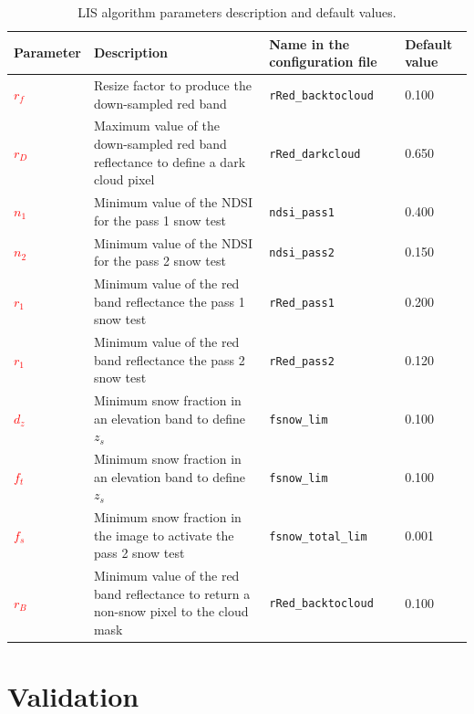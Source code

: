 \documentclass[a4paper]{article}
\begin{document}
\begin{table}
\begin{center}
\begin{tabularx}{\textwidth}{|l X l l|}
\hline
Parameter & Description & Name in the configuration file & Default value\\
\hline
\textcolor{red}{$r_f$} & Resize factor to produce the down-sampled red band & \texttt{rRed\_backtocloud} & 0.100 \\
\textcolor{red}{$r_D$} & Maximum value of the down-sampled red band reflectance to define a dark cloud pixel & \texttt{rRed\_darkcloud} & 0.650 \\
\textcolor{red}{$n_1$} & Minimum value of the NDSI for the pass 1 snow test & \texttt{ndsi\_pass1} & 0.400\\
\textcolor{red}{$n_2$} & Minimum value of the NDSI for the pass 2 snow test & \texttt{ndsi\_pass2} & 0.150\\
\textcolor{red}{$r_1$} & Minimum value of the red band reflectance the pass 1 snow test  & \texttt{rRed\_pass1} & 0.200 \\
\textcolor{red}{$r_1$} & Minimum value of the red band reflectance the pass 2 snow test  & \texttt{rRed\_pass2} & 0.120 \\
\textcolor{red}{$d_z$} & Minimum snow fraction in an elevation band to define $z_s$ & \texttt{fsnow\_lim} & 0.100 \\
\textcolor{red}{$f_t$} & Minimum snow fraction in an elevation band to define $z_s$ & \texttt{fsnow\_lim} & 0.100 \\
\textcolor{red}{$f_s$} & Minimum snow fraction in the image to activate the pass 2 snow test & \texttt{fsnow\_total\_lim} & 0.001 \\
\textcolor{red}{$r_B$} & Minimum value of the red band reflectance to return a non-snow pixel to the cloud mask & \texttt{rRed\_backtocloud} & 0.100 \\
\hline
\end{tabularx}
\end{center}
\caption{LIS algorithm parameters description and default values.}
\end{table}\label{tab:param}



\section{Validation}\label{par:validation}
\end{document}
